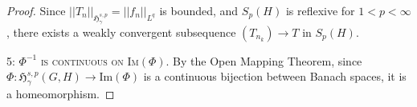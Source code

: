\documentclass[10pt,a4paper]{amsart}
\begin{document}
\begin{proof}
Since $||T_n||_{\mathfrak{H}^{s,p}_\gamma} = ||f_n||_{L^q}$ is bounded, and $S_p(H)$ is reflexive  for $1 < p < \infty$, there exists a weakly convergent subsequence $(T_{n_k}) \rightarrow T \text{  in } S_p(H)$.


\bigskip

\textsc{5: $\Phi^{-1}$ is continuous on $\text{Im}(\Phi)$.} By the Open Mapping Theorem, since $\Phi: \mathfrak{H}_\gamma^{s,p}(G,H) \to \text{Im}(\Phi)$ is a continuous bijection between Banach spaces, it is a homeomorphism.
\end{proof}
\end{document}
